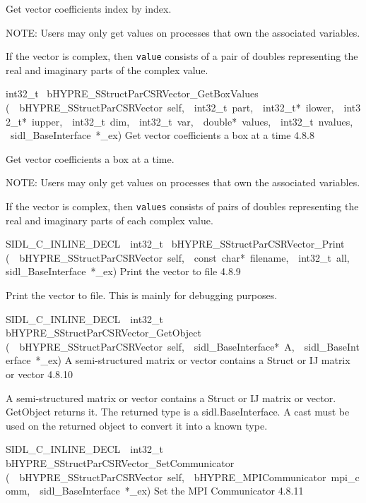 \documentclass{article}
\begin{document}
\begin{cxxentry}
\begin{cxxentry}
\begin{cxxfunction}
\begin{cxxdoc}
Get vector coefficients index by index.

NOTE: Users may only get values on processes that own the
associated variables.

If the vector is complex, then {\tt value} consists of a pair
of doubles representing the real and imaginary parts of the
complex value.
\end{cxxdoc}
\end{cxxfunction}
\begin{cxxfunction}
{int32\_t\ }
        {bHYPRE\_SStructParCSRVector\_GetBoxValues}
        {(\ \ bHYPRE\_SStructParCSRVector\ self,\ \ int32\_t\ part,\ \ int32\_t*\ ilower,\ \ int32\_t*\ iupper,\ \ int32\_t\ dim,\ \ int32\_t\ var,\ \ double*\ values,\ \ int32\_t\ nvalues,\ \ sidl\_BaseInterface\ *\_ex)}
        {
Get vector coefficients a box at a time}
        {4.8.8}
\begin{cxxdoc}

Get vector coefficients a box at a time.

NOTE: Users may only get values on processes that own the
associated variables.

If the vector is complex, then {\tt values} consists of pairs
of doubles representing the real and imaginary parts of each
complex value.
\end{cxxdoc}
\end{cxxfunction}
\begin{cxxfunction}
{SIDL\_C\_INLINE\_DECL\ \ int32\_t\ }
        {bHYPRE\_SStructParCSRVector\_Print}
        {(\ \ bHYPRE\_SStructParCSRVector\ self,\ \ const\ char*\ filename,\ \ int32\_t\ all,\ \ sidl\_BaseInterface\ *\_ex)}
        {
Print the vector to file}
        {4.8.9}
\begin{cxxdoc}

Print the vector to file.  This is mainly for debugging
purposes.
\end{cxxdoc}
\end{cxxfunction}
\begin{cxxfunction}
{SIDL\_C\_INLINE\_DECL\ \ int32\_t\ }
        {bHYPRE\_SStructParCSRVector\_GetObject}
        {(\ \ bHYPRE\_SStructParCSRVector\ self,\ \ sidl\_BaseInterface*\ A,\ \ sidl\_BaseInterface\ *\_ex)}
        {
A semi-structured matrix or vector contains a Struct or IJ matrix
or vector}
        {4.8.10}
\begin{cxxdoc}

A semi-structured matrix or vector contains a Struct or IJ matrix
or vector.  GetObject returns it.
The returned type is a sidl.BaseInterface.
A cast must be used on the returned object to convert it into a known type.
\end{cxxdoc}
\end{cxxfunction}
\begin{cxxfunction}
{SIDL\_C\_INLINE\_DECL\ \ int32\_t\ }
        {bHYPRE\_SStructParCSRVector\_SetCommunicator}
        {(\ \ bHYPRE\_SStructParCSRVector\ self,\ \ bHYPRE\_MPICommunicator\ mpi\_comm,\ \ sidl\_BaseInterface\ *\_ex)}
        {
Set the MPI Communicator}
        {4.8.11}
\begin{cxxdoc}


\end{cxxdoc}
\end{cxxfunction}
\end{cxxentry}
\end{cxxentry}
\end{document}

